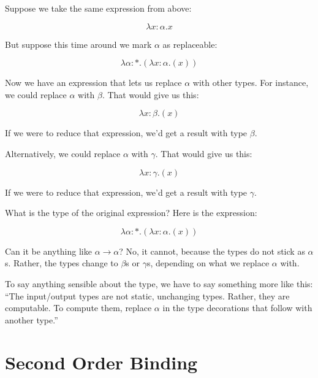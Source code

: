 \documentclass{book}
\numberwithin{equation}{chapter}
\begin{document}
Suppose we take the same expression from above:

\begin{equation}
\lambda x: \alpha.x
\end{equation}

\noindent
But suppose this time around we mark $\alpha$ as replaceable:

\begin{equation}
\lambda \alpha : *.(\lambda x: \alpha.(x))
\end{equation}

\noindent
Now we have an expression that lets us replace $\alpha$ with other types. For instance, we could replace $\alpha$ with $\beta$. That would give us this:

\begin{equation}
\lambda x: \beta.(x)
\end{equation}

\noindent
If we were to reduce that expression, we'd get a result with type $\beta$.

Alternatively, we could replace $\alpha$ with $\gamma$. That would give us this:

\begin{equation}
\lambda x: \gamma.(x)
\end{equation}

\noindent
If we were to reduce that expression, we'd get a result with type $\gamma$.

What is the type of the original expression? Here is the expression:

\begin{equation}
\lambda \alpha : *.(\lambda x: \alpha.(x))
\end{equation}

\noindent
Can it be anything like $\alpha \rightarrow \alpha$? No, it cannot, because the types do not stick as $\alpha$s. Rather, the types change to $\beta$s or $\gamma$s, depending on what we replace $\alpha$ with.

To say anything sensible about the type, we have to say something more like this: ``The input/output types are not static, unchanging types. Rather, they are computable. To compute them, replace $\alpha$ in the type decorations that follow with another type.''


\section{Second Order Binding}
\end{document}
